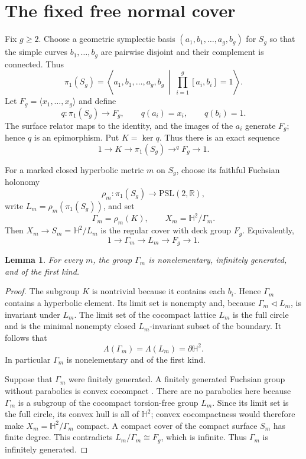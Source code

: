 \documentclass[11pt]{article}
\newtheorem{lemma}[theorem]{Lemma}
\theoremstyle{definition}
\newcommand{\Hh}{\mathbb H^2}
\begin{document}
\section{The fixed free normal cover}

Fix $g\ge2$.  Choose a geometric symplectic basis
$(a_1,b_1,\ldots,a_g,b_g)$ for $S_g$ so that the simple curves
$b_1,\ldots,b_g$ are pairwise disjoint and their complement is connected.
Thus
\[
 \pi_1(S_g)=\left\langle a_1,b_1,\ldots,a_g,b_g\ \middle|\
 \prod_{i=1}^g[a_i,b_i]=1\right\rangle .
\]
Let $F_g=\langle x_1,\ldots,x_g\rangle$ and define
\begin{equation}\label{eq:q}
 q:\pi_1(S_g)\longrightarrow F_g,
 \qquad q(a_i)=x_i,\qquad q(b_i)=1.
\end{equation}
The surface relator maps to the identity, and the images of the $a_i$ generate
$F_g$; hence $q$ is an epimorphism.  Put $K=\ker q$.
Thus there is an exact sequence
\[
 1\longrightarrow K\longrightarrow\pi_1(S_g)
 \mathrel{\mathop{\longrightarrow}^{q}}F_g\longrightarrow1.
\]

For a marked closed hyperbolic metric $m$ on $S_g$, choose its faithful
Fuchsian holonomy
\[
 \rho_m:\pi_1(S_g)\longrightarrow \mathrm{PSL}(2,\mathbb R),
\]
write $L_m=\rho_m(\pi_1(S_g))$, and set
\[
 \Gamma_m=\rho_m(K),\qquad X_m=\Hh/\Gamma_m.
\]
Then $X_m\to S_m=\Hh/L_m$ is the regular cover with deck group $F_g$.
Equivalently,
\[
 1\longrightarrow\Gamma_m\longrightarrow L_m
 \longrightarrow F_g\longrightarrow1.
\]

\begin{lemma}\label{lem:first-kind}
For every $m$, the group $\Gamma_m$ is nonelementary, infinitely generated,
and of the first kind.
\end{lemma}

\begin{proof}
The subgroup $K$ is nontrivial because it contains each $b_i$.  Hence
$\Gamma_m$ contains a hyperbolic element.  Its limit set is nonempty and,
because $\Gamma_m\triangleleft L_m$, is invariant under $L_m$.  The limit set
of the cocompact lattice $L_m$ is the full circle and is the minimal nonempty
closed $L_m$-invariant subset of the boundary.  It follows that
\[
 \Lambda(\Gamma_m)=\Lambda(L_m)=\partial\Hh.
\]
In particular $\Gamma_m$ is nonelementary and of the first kind.

Suppose that $\Gamma_m$ were finitely generated.  A finitely generated
Fuchsian group without parabolics is convex cocompact
\citep[see, for example,][]{Beardon1983}.  There are no parabolics here because
$\Gamma_m$ is a subgroup of the cocompact torsion-free group $L_m$.  Since its
limit set is the full circle, its convex hull is all of $\Hh$; convex
cocompactness would therefore make $X_m=\Hh/\Gamma_m$ compact.  A compact
cover of the compact surface $S_m$ has finite degree.  This contradicts
$L_m/\Gamma_m\cong F_g$, which is infinite.  Thus $\Gamma_m$ is infinitely
generated.
\end{proof}
\end{document}
